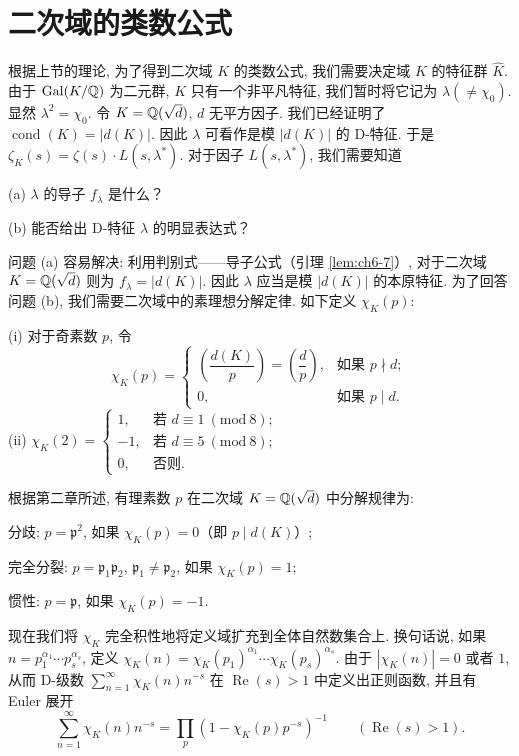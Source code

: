 \section{二次域的类数公式}\label{sec:ch6-s2}

根据上节的理论, 为了得到二次域 $K$ 的类数公式, 我们需要决定域 $K$ 的特征群 $\widehat{K}$. 由于 $\operatorname{Gal}(K/\mathbb{Q})$ 为二元群, $K$ 只有一个非平凡特征, 我们暂时将它记为 $\lambda(\neq\chi_0)$. 显然 $\lambda^2=\chi_0$. 令 $K=\mathbb{Q}(\sqrt{d})$, $d$ 无平方因子. 我们已经证明了 $\operatorname{cond}(K)=|d(K)|$. 因此 $\lambda$ 可看作是模 $|d(K)|$ 的 D-特征. 于是 $\zeta_K(s)=\zeta(s)\cdot L(s,\lambda^*)$. 对于因子 $L(s,\lambda^*)$, 我们需要知道

(a) $\lambda$ 的导子 $f_\lambda$ 是什么？

(b) 能否给出 D-特征 $\lambda$ 的明显表达式？

问题 (a) 容易解决: 利用判别式——导子公式（引理 \ref{lem:ch6-7}）, 对于二次域 $K=\mathbb{Q}(\sqrt{d})$ 则为 $f_\lambda=|d(K)|$. 因此 $\lambda$ 应当是模 $|d(K)|$ 的本原特征. 为了回答问题 (b), 我们需要二次域中的素理想分解定律. 如下定义 $\chi_K(p)$:

(i) 对于奇素数 $p$, 令
\[
  \chi_K(p)=\begin{cases}
    \left(\dfrac{d(K)}{p}\right)=\left(\dfrac{d}{p}\right), & \text{如果 } p\nmid d;\\[0.5em]
    0, & \text{如果 } p\mid d.
  \end{cases}
\]
(ii) $\chi_K(2)=\begin{cases}
  1, & \text{若 } d\equiv 1\ (\mathrm{mod}\ 8);\\
  -1, & \text{若 } d\equiv 5\ (\mathrm{mod}\ 8);\\
  0, & \text{否则}.
\end{cases}$

根据第二章所述, 有理素数 $p$ 在二次域 $K=\mathbb{Q}(\sqrt{d})$ 中分解规律为:

分歧: $p=\mathfrak{p}^2$, 如果 $\chi_K(p)=0$（即 $p\mid d(K)$）;

完全分裂: $p=\mathfrak{p}_1\mathfrak{p}_2$, $\mathfrak{p}_1\neq\mathfrak{p}_2$, 如果 $\chi_K(p)=1$;

惯性: $p=\mathfrak{p}$, 如果 $\chi_K(p)=-1$.

现在我们将 $\chi_K$ 完全积性地将定义域扩充到全体自然数集合上. 换句话说, 如果 $n=p_1^{\alpha_1}\cdots p_s^{\alpha_s}$, 定义 $\chi_K(n)=\chi_K(p_1)^{\alpha_1}\cdots\chi_K(p_s)^{\alpha_s}$. 由于 $|\chi_K(n)|=0$ 或者 $1$, 从而 D-级数 $\sum_{n=1}^{\infty}\chi_K(n)n^{-s}$ 在 $\operatorname{Re}(s)>1$ 中定义出正则函数, 并且有 Euler 展开
\[
  \sum_{n=1}^{\infty}\chi_K(n)n^{-s}=\prod_p(1-\chi_K(p)p^{-s})^{-1}\qquad(\operatorname{Re}(s)>1).
\]

